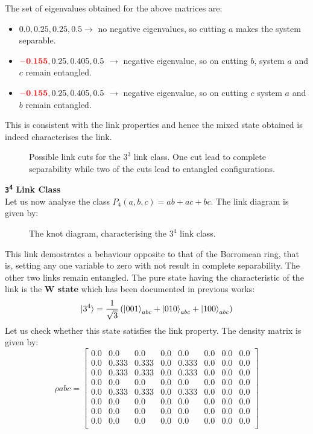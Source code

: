 \documentclass{scrartcl}
\begin{document}
            The set of eigenvalues obtained for the above matrices are:
            \begin{itemize}
                \item $0.0, 0.25, 0.25, 0.5 \longrightarrow$ no negative eigenvalues, so cutting $a$ makes the system separable.        
                \item $\mathbf{\mathcolor{red}{-0.155}}, 0.25, 0.405, 0.5$ $\longrightarrow$ negative eigenvalue, so on cutting $b$, system $a$ and $c$ remain entangled.
                \item $\mathbf{\mathcolor{red}{-0.155}}, 0.25, 0.405, 0.5$ $\longrightarrow$ negative eigenvalue, so on cutting $c$  system $a$ and $b$ remain entangled.
            \end{itemize}
            This is consistent with the link properties and hence the mixed state obtained is indeed characterises the link. 
            \begin{figure}[H]
                \centering
                \scalebox{0.8}{ }
                \caption{Possible link cuts for the $3^3$ link class. One cut lead to complete separability while two of the cuts lead to entangled configurations.}
            \end{figure}
            \noindent   
\textbf{\large \texttt{3\textsuperscript{4}} Link Class} \\[0.3cm]
Let us now analyse the class $P_4(a,b,c) = ab+ac+bc$. The link diagram is given by:
\begin{figure}[H]
    \centering
    
  \caption{The knot diagram, characterising the $3^4$ link class.}
\end{figure}
\noindent
This link demostrates a behaviour opposite to that of the Borromean ring, that is, setting any one variable to zero with not result in complete separability. The other two links remain entangled. The pure state having the characteristic of the link is the \textbf{W state} which has been documented in previous works:
$$\ket{3^4} = \frac{1}{\sqrt{3}}\left( \ket{001}_{abc}+\ket{010}_{abc}+\ket{100}_{abc} \right)$$ 
Let us check whether this state satisfies the link property. The density matrix is given by:
\begin{equation*}
    \rho{abc}=
    \left[
    \begin{array}{cccccccc}
    0.0 & 0.0 & 0.0 & 0.0 & 0.0 & 0.0 & 0.0 & 0.0 \\
    0.0 & 0.333 & 0.333 & 0.0 & 0.333 & 0.0 & 0.0 & 0.0 \\
    0.0 & 0.333 & 0.333 & 0.0 & 0.333 & 0.0 & 0.0 & 0.0 \\
    0.0 & 0.0 & 0.0 & 0.0 & 0.0 & 0.0 & 0.0 & 0.0 \\
    0.0 & 0.333 & 0.333 & 0.0 & 0.333 & 0.0 & 0.0 & 0.0 \\
    0.0 & 0.0 & 0.0 & 0.0 & 0.0 & 0.0 & 0.0 & 0.0 \\
    0.0 & 0.0 & 0.0 & 0.0 & 0.0 & 0.0 & 0.0 & 0.0 \\
    0.0 & 0.0 & 0.0 & 0.0 & 0.0 & 0.0 & 0.0 & 0.0 \\
    \end{array}
    \right]
    \end{equation*}
\end{document}
